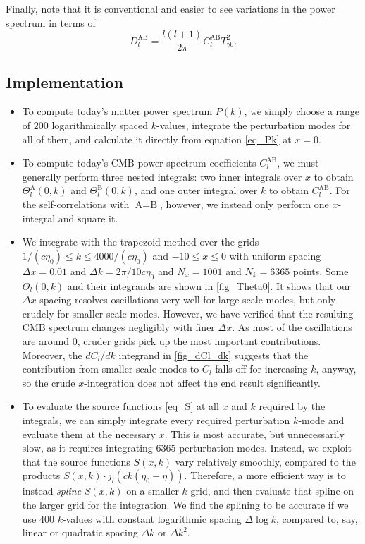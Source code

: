 \documentclass[10pt,a4paper]{article}
\begin{document}
Finally, note that it is conventional and easier to see variations in the power spectrum in terms of
\begin{equation}
	D_l^\text{AB} = \frac{l (l+1)}{2 \pi} C_l^\text{AB} T_{\gamma 0}^2 .
\label{eq_Dl}
\end{equation}

\subsection{Implementation}

\begin{itemize}
\item
To compute today's matter power spectrum $P(k)$,
we simply choose a range of $200$ logarithmically spaced $k$-values,
integrate the perturbation modes for all of them,
and calculate it directly from equation \eqref{eq_Pk} at $x=0$.

\item
To compute today's CMB power spectrum coefficients $C_l^\text{AB}$,
we must generally perform three nested integrals:
two inner integrals over $x$ to obtain $\Theta_l^\text{A}(0,k)$ and $\Theta_l^\text{B}(0,k)$,
and one outer integral over $k$ to obtain $C_l^\text{AB}$.
For the self-correlations with $\text{A}=\text{B}$, however,
we instead only perform one $x$-integral and square it.

\item
We integrate with the trapezoid method over the grids
$1/(c\eta_0) \leq k \leq 4000/(c\eta_0)$ and $-10 \leq x \leq 0$
with uniform spacing $\Delta x = 0.01$ and $\Delta k = 2 \pi / 10 c \eta_0$
and $N_x = 1001$ and $N_k = 6365$ points.
Some $\Theta_l(0,k)$ and their integrands are shown in \cref{fig_Theta0}.
It shows that our $\Delta x$-spacing resolves oscillations very well for large-scale modes,
but only crudely for smaller-scale modes.
However, we have verified that the resulting CMB spectrum changes negligibly with finer $\Delta x$.
As most of the oscillations are around $0$, cruder grids pick up the most important contributions.
Moreover, the $d C_l/dk$ integrand in \cref{fig_dCl_dk} suggests that
the contribution from smaller-scale modes to $C_l$ falls off for increasing $k$, anyway,
so the crude $x$-integration does not affect the end result significantly.

\item
To evaluate the source functions \eqref{eq_S} at all $x$ and $k$ required by the integrals,
we can simply integrate every required perturbation $k$-mode and evaluate them at the necessary $x$.
This is most accurate, but unnecessarily slow, as it requires integrating $6365$ perturbation modes.
Instead, we exploit that
the source functions $S(x,k)$ vary relatively smoothly,
compared to the products $S(x,k) \cdot j_l(ck(\eta_0-\eta))$.
Therefore, a more efficient way is to instead \emph{spline} $S(x,k)$ on a smaller $k$-grid,
and then evaluate that spline on the larger grid for the integration.
We find the splining to be accurate if we use $400$ $k$-values with constant logarithmic spacing $\Delta \log k$,
compared to, say, linear or quadratic spacing $\Delta k$ or $\Delta k^2$.


\end{itemize}
\end{document}
